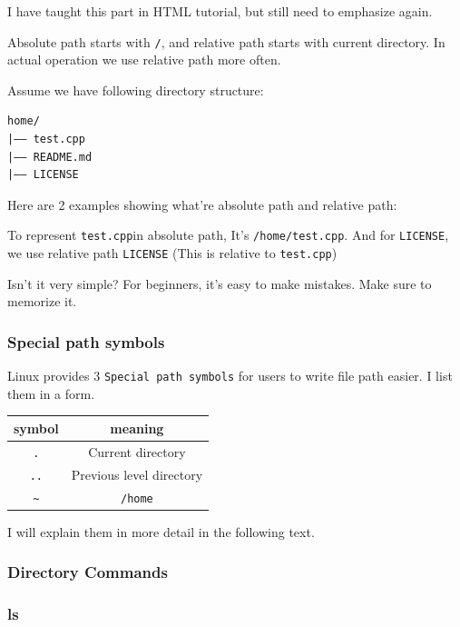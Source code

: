\documentclass[12pt]{ctexart}
\begin{document}
I have taught this part in HTML tutorial, but still need to emphasize
again.

Absolute path starts with \texttt{/}, and relative path starts with
current directory. In actual operation we use relative path more often.

Assume we have following directory structure:

\begin{adjustwidth}{2em}{0pt}
\begin{verbatim}
home/
|—— test.cpp
|—— README.md
|—— LICENSE
\end{verbatim}
\end{adjustwidth}

Here are 2 examples showing what're absolute path and
relative path:

To represent \texttt{test.cpp}in absolute path, It's
\texttt{/home/test.cpp}. And for \texttt{LICENSE}, we use relative path
\texttt{LICENSE} (This is relative to \texttt{test.cpp})

Isn't it very simple? For beginners,
it's easy to make mistakes. Make sure to memorize it.

\subsubsection{\textbf{Special path symbols}}

Linux provides 3 \texttt{Special\ path\ symbols} for users to write file
path easier. I list them in a form.

\begin{table}[H]
    \centering
    \begin{tabular}{cc}
    \toprule
    symbol & meaning \\
    \midrule
    \texttt{.} & Current directory \\
    \texttt{..} & Previous level directory \\
    \texttt{\textasciitilde{}} & \texttt{/home} \\
    \bottomrule
    \end{tabular}
\end{table}
I will explain them in more detail in the following text.

\subsubsection{\textbf{Directory Commands}}

\subsubsection*{\textbf{ls}}
\end{document}
